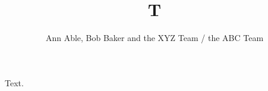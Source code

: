 \documentclass{article}
\begin{document}
\title{T}
\author{Ann Able, Bob Baker and the XYZ Team / the ABC Team}
\maketitle
Text.
\end{document}
